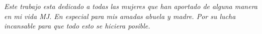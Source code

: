 
\begin{dedication} %

\textit{Este trabajo esta dedicado a todas las mujeres que han aportado de alguna manera en mi vida M{\tiny{J}}. En especial para mis amadas abuela y madre. Por su lucha incansable para que todo esto se hiciera posible.}

\end{dedication}

